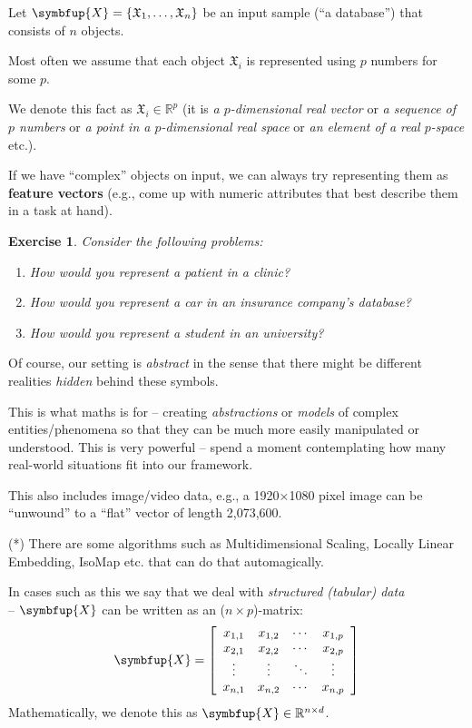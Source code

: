 \documentclass[10pt,b5paper,krantz1]{krantz}
\newtheorem{exercise}{Exercise}[chapter]
\renewcommand{\mathbf}[1]{\symbfup{#1}}
\begin{document}
Let \(\mathbf{X}=\{\mathfrak{X}_1,\dots,\mathfrak{X}_n\}\)
be an input sample (``a database'')
that consists of \(n\) objects.

Most often we assume that each object \(\mathfrak{X}_i\)
is represented using \(p\) numbers for some \(p\).

We denote this fact as \(\mathfrak{X}_i\in \mathbb{R}^p\)
(it is \emph{a \(p\)-dimensional real vector} or
\emph{a sequence of \(p\) numbers} or
\emph{a point in a \(p\)-dimensional real space}
or \emph{an element of a real \(p\)-space} etc.).

If we have ``complex'' objects on input,
we can always try representing them as \textbf{feature vectors} (e.g.,
come up with numeric attributes that best describe them in a task at hand).

\begin{exercise}

Consider the following problems:

\begin{enumerate}
\def\labelenumi{\arabic{enumi}.}
\item
  How would you represent a patient in a clinic?
\item
  How would you represent a car in an insurance company's database?
\item
  How would you represent a student in an university?
\end{enumerate}

\end{exercise}

Of course, our setting is \emph{abstract} in the sense that
there might be different realities \emph{hidden} behind these symbols.

This is what maths is for -- creating \emph{abstractions} or \emph{models}
of complex entities/phenomena so that they can be much more easily manipulated
or understood.
This is very powerful -- spend a moment
contemplating how many real-world situations fit into our framework.

This also includes image/video data, e.g., a 1920×1080 pixel image
can be ``unwound'' to a ``flat'' vector of length 2,073,600.

(*) There are some algorithms such as Multidimensional Scaling,
Locally Linear Embedding, IsoMap etc.
that can do that automagically.

\bigskip

In cases such as this we say that we deal with \emph{structured (tabular) data}\\
-- \(\mathbf{X}\) can be written as an (\(n\times p\))-matrix:
\[
\mathbf{X}=
\left[
\begin{array}{cccc}
x_{1,1} & x_{1,2} & \cdots & x_{1,p} \\
x_{2,1} & x_{2,2} & \cdots & x_{2,p} \\
\vdots & \vdots & \ddots & \vdots \\
x_{n,1} & x_{n,2} & \cdots & x_{n,p} \\
\end{array}
\right]
\]
Mathematically, we denote this as \(\mathbf{X}\in\mathbb{R}^{n\times d}\).
\end{document}
